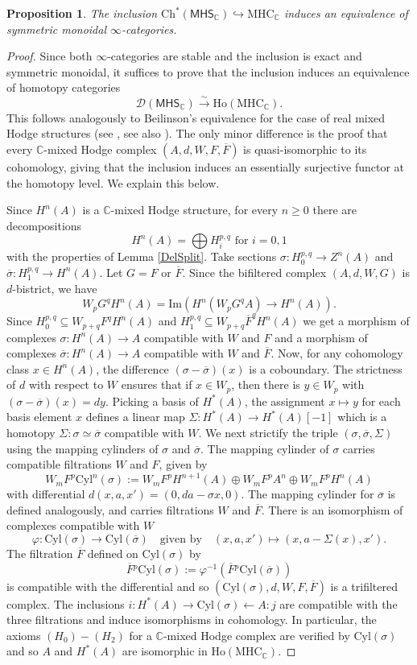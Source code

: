 \documentclass[a4paper]{amsart}
\newtheorem{prop}[theo]{Proposition}
\theoremstyle{definition}
\theoremstyle{theorem}
\newcommand{\CC}{\mathbb{C}}
\newcommand{\Dd}{\mathcal{D}}
\newcommand{\Ho}{\mathrm{Ho}}
\newcommand{\ov}{\overline}
\newcommand{\lra}{\longrightarrow}
\newcommand{\ch}[1]{\mathrm{Ch^*({#1})}}
\newcommand{\MHS}{{\mathsf{MHS}}}
\newcommand{\MHC}{{\mathrm{MHC}}}
\begin{document}
\begin{prop}\label{equivalenceproof}
The inclusion  $\ch{\MHS_\CC}\hookrightarrow \MHC_\CC$ induces an equivalence of symmetric monoidal $\infty$-categories.
\end{prop}
\begin{proof}
Since both $\infty$-categories are stable and the inclusion is exact and symmetric monoidal, it suffices to prove that
the inclusion induces an equivalence of homotopy categories 
\[\Dd(\MHS_\CC)\stackrel{\sim}{\lra} \mathrm{Ho}(\MHC_\CC).\]
This follows analogously to Beilinson's equivalence for the case of real mixed Hodge structures (see \cite{Beilinson}, see also \cite{CG2}). The only minor difference is the proof that 
every $\CC$-mixed Hodge complex $(A,d,W,F,\ov F)$ is quasi-isomorphic to its cohomology, giving that the inclusion induces an essentially surjective functor at the homotopy level. We explain this below.

Since $H^n(A)$ is a $\CC$-mixed Hodge structure, for every $n\geq 0$ there are decompositions
 \[H^n(A)=\bigoplus H^{p,q}_i\text{ for }i=0,1\]
with the properties of Lemma \ref{DelSplit}.
Take sections $\sigma:H^{p,q}_0\to Z^n(A)$ and $\ov{\sigma}:H^{p,q}_1\to H^n(A)$.
Let $G=F$ or $\ov F$. Since the bifiltered complex $(A,d,W,G)$ is $d$-bistrict, we have
\[W_pG^qH^n(A)=\mathrm{Im}(H^n(W_pG^qA)\to H^n(A)).\]
Since $H^{p,q}_0\subseteq W_{p+q}F^qH^n(A)$ and $H^{p,q}_1\subseteq W_{p+q}\ov F^qH^n(A)$ we get
 a morphism of complexes $\sigma:H^n(A)\to A$ compatible with $W$ and $F$ and a morphism of complexes $\ov\sigma:H^n(A)\to A$ compatible with $W$ and $\ov F$.
Now, for any cohomology class $x\in H^n(A)$, the difference $(\sigma-\ov{\sigma})(x)$ is a coboundary. The strictness of $d$ with respect to $W$ ensures that if $x\in W_p$, then there is  $y\in W_p$ with 
$(\sigma-\ov{\sigma})(x)=dy$. Picking a basis of $H^*(A)$, the assignment $x\mapsto y$
for each basis element $x$ defines a linear map $\Sigma:H^*(A)\to H^*(A)[-1]$ which is a homotopy
 $\Sigma:\sigma\simeq \ov\sigma$ compatible with $W$.
We next strictify the triple $(\sigma,\ov\sigma,\Sigma)$ using the mapping cylinders of $\sigma$ and $\ov\sigma$.
The mapping cylinder of $\sigma$ carries compatible filtrations $W$ and $F$, 
given by 
\[W_mF^p\mathrm{Cyl}^n(\sigma):=W_mF^pH^{n+1}(A)\oplus W_mF^pA^n\oplus W_mF^pH^n(A)\]
with differential $d(x,a,x')=(0,da-\sigma x,0)$.
The mapping cylinder for $\ov\sigma$ is defined analogously, and carries filtrations $W$ and $\ov F$.
There is an isomorphism of complexes compatible with $W$
\[\varphi:\mathrm{Cyl}(\sigma)\to \mathrm{Cyl}(\ov\sigma)\quad\text{given by}\quad 
(x,a,x')\mapsto (x,a-\Sigma(x),x').\]
The filtration $\ov F$ defined on $\mathrm{Cyl}(\sigma)$ by 
\[\ov F{}^p\mathrm{Cyl}(\sigma):=\varphi^{-1}(\ov{F}{}^p\mathrm{Cyl}(\ov\sigma))\]
is compatible with the differential and so $(\mathrm{Cyl}(\sigma),d,W,F,\ov F)$ is a trifiltered complex.
The inclusions $i:H^*(A)\to \mathrm{Cyl}(\sigma)\leftarrow A:j$ are compatible with the three filtrations and induce isomorphisms in cohomology. In particular, the axioms $(H_0)-(H_2)$ for a $\CC$-mixed Hodge complex are verified by 
$\mathrm{Cyl}(\sigma)$ and so $A$ and $H^*(A)$ are isomorphic in $\Ho(\MHC_\CC)$.
\end{proof}
\end{document}
